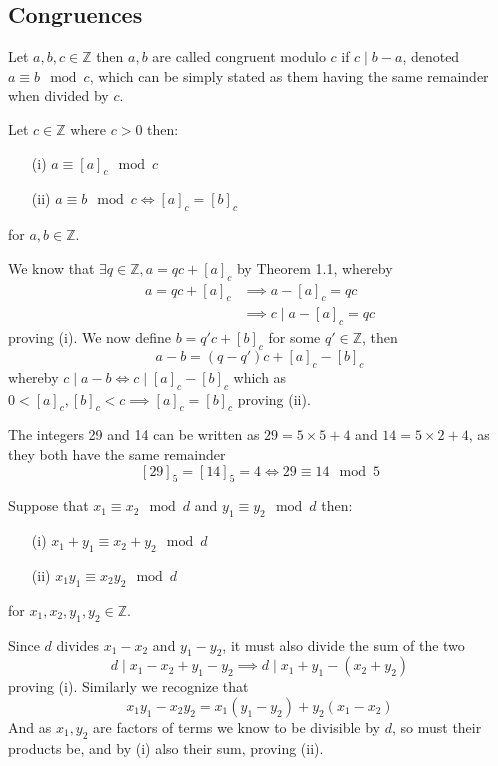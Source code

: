 \subsection{Congruences}
\begin{defi}[Congruence]
    Let $a,b,c\in\mathbb{Z}$ then $a,b$ are called congruent modulo $c$ if $c\mid b-a$, denoted $a\equiv b\mod c$, which can be simply stated as them having the same remainder when divided by $c$.
\end{defi}
\begin{prop}[Congruence]
    Let $c\in\mathbb{Z}$ where $c>0$ then:
    \begin{itemize}
        \item[(i)] $a\equiv[a]_{c}\mod c$
        \item[(ii)] $a\equiv b\mod c\iff[a]_{c}=[b]_{c}$
    \end{itemize}
    for $a,b\in\mathbb{Z}$.
\end{prop}
\begin{prf}
    We know that $\exists q\in\mathbb{Z},a=qc+[a]_{c}$ by Theorem 1.1, whereby
    \begin{align*}
        a=qc+[a]_{c}&\implies a-[a]_{c}=qc \\
                    &\implies c\mid a-[a]_{c}=qc
    \end{align*}
    proving (i). We now define $b=q'c+[b]_{c}$ for some $q'\in\mathbb{Z}$, then
    \[
        a-b=(q-q')c+[a]_{c}-[b]_{c}
    \]
    whereby $c\mid a-b\iff c\mid[a]_{c}-[b]_{c}$ which as $0<[a]_{c},[b]_{c}<c\implies[a]_{c}=[b]_{c}$ proving (ii).
\end{prf}
\begin{exmp}
  The integers 29 and 14 can be written as $29=5\times 5+4$ and $14=5\times 2+4$, as they both have the same remainder
  \[
      [29]_{5}=[14]_{5}=4\iff 29\equiv 14\mod 5
  \]
\end{exmp}
\begin{prop}
    Suppose that $x_{1}\equiv x_{2}\mod d$ and $y_{1}\equiv y_{2}\mod d$ then:
    \begin{itemize}
        \item[(i)] $x_{1}+y_{1}\equiv x_{2}+y_{2}\mod d$
        \item[(ii)] $x_{1}y_{1}\equiv x_{2}y_{2}\mod d$
    \end{itemize}
    for $x_{1},x_{2},y_{1},y_{2}\in\mathbb{Z}$.
\end{prop}
\begin{prf}
    Since $d$ divides $x_{1}-x_{2}$ and $y_{1}-y_{2}$, it must also divide the sum of the two
    \[
        d\mid x_{1}-x_{2}+y_{1}-y_{2}\implies d\mid x_{1}+y_{1}-(x_{2}+y_{2})
    \]
    proving (i). Similarly we recognize that
    \[
        x_{1}y_{1}-x_{2}y_{2}=x_{1}(y_{1}-y_{2})+y_{2}(x_{1}-x_{2})
    \]
    And as $x_{1},y_{2}$ are factors of terms we know to be divisible by $d$, so must their products be, and by (i) also their sum, proving (ii).
\end{prf}
